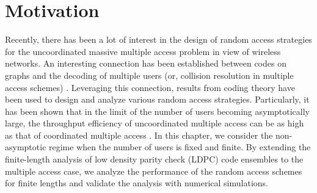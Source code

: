 

\section{Motivation}
Recently, there has been a lot of interest in the design of random access strategies for the uncoordinated massive multiple access problem in view of wireless networks. An interesting connection has been established between codes on graphs and the decoding of multiple users (or, collision resolution in multiple access schemes) \cite{liva2011graph}. Leveraging this connection, results from coding theory have been used to design and analyze various random access strategies. Particularly, it has been shown that in the limit of the number of users becoming asymptotically large, the throughput efficiency of uncoordinated multiple access can be as high as that of coordinated multiple access \cite{narayanan2012iterative}. In this chapter, we consider the non-asymptotic regime when the number of users is fixed and finite. By extending the finite-length analysis of low density parity check (LDPC) code ensembles \cite{amraoui2007find} to the multiple access case, we analyze the performance of the random access schemes for finite lengths and validate the analysis with numerical simulations.

